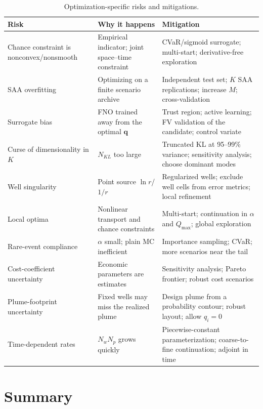 \documentclass[11pt]{article}
\numberwithin{equation}{section}
\newcommand{\tabhead}[1]{\textbf{#1}}
\theoremstyle{plain}
\begin{document}
\begin{table}[htbp]
\centering
\small
\begin{tabularx}{\textwidth}{@{}lYY@{}}
\toprule
\tabhead{Risk} & \tabhead{Why it happens} & \tabhead{Mitigation}\\
\midrule
Chance constraint is nonconvex/nonsmooth & Empirical indicator; joint
space--time constraint & CVaR/sigmoid surrogate; multi-start; derivative-free
exploration\\
SAA overfitting & Optimizing on a finite scenario archive & Independent test
set; $K$ SAA replications; increase $M$; cross-validation\\
Surrogate bias & FNO trained away from the optimal $\mathbf{q}$ & Trust
region; active learning; FV validation of the candidate; control variate\\
Curse of dimensionality in $K$ & $N_{KL}$ too large & Truncated KL at 95--99\%
variance; sensitivity analysis; choose dominant modes\\
Well singularity & Point source $\ln r$/$1/r$ & Regularized wells; exclude
well cells from error metrics; local refinement\\
Local optima & Nonlinear transport and chance constraints & Multi-start;
continuation in $\alpha$ and $Q_{\max}$; global exploration\\
Rare-event compliance & $\alpha$ small; plain MC inefficient & Importance
sampling; CVaR; more scenarios near the tail\\
Cost-coefficient uncertainty & Economic parameters are estimates &
Sensitivity analysis; Pareto frontier; robust cost scenarios\\
Plume-footprint uncertainty & Fixed wells may miss the realized plume &
Design plume from a probability contour; robust layout; allow $q_i=0$\\
Time-dependent rates & $N_wN_p$ grows quickly & Piecewise-constant
parameterization; coarse-to-fine continuation; adjoint in time\\
\bottomrule
\end{tabularx}
\caption{Optimization-specific risks and mitigations.}
\label{tab:risks}
\end{table}

\section{Summary}
\label{sec:summary}
\end{document}
